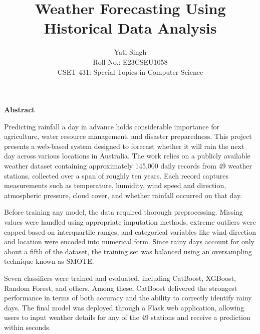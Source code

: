 \documentclass[12pt,a4paper]{article}
\title{\textbf{Weather Forecasting Using Historical Data Analysis}}
\author{Yati Singh \\ Roll No.: E23CSEU1058 \\ CSET 431: Special Topics in Computer Science}
\date{}
\begin{document}
\maketitle

\begin{center}
\textbf{Abstract}
\end{center}

\noindent
Predicting rainfall a day in advance holds considerable importance for agriculture, water resource management, and disaster preparedness. This project presents a web-based system designed to forecast whether it will rain the next day across various locations in Australia. The work relies on a publicly available weather dataset containing approximately 145,000 daily records from 49 weather stations, collected over a span of roughly ten years. Each record captures measurements such as temperature, humidity, wind speed and direction, atmospheric pressure, cloud cover, and whether rainfall occurred on that day.

Before training any model, the data required thorough preprocessing. Missing values were handled using appropriate imputation methods, extreme outliers were capped based on interquartile ranges, and categorical variables like wind direction and location were encoded into numerical form. Since rainy days account for only about a fifth of the dataset, the training set was balanced using an oversampling technique known as SMOTE.

Seven classifiers were trained and evaluated, including CatBoost, XGBoost, Random Forest, and others. Among these, CatBoost delivered the strongest performance in terms of both accuracy and the ability to correctly identify rainy days. The final model was deployed through a Flask web application, allowing users to input weather details for any of the 49 stations and receive a prediction within seconds.
\end{document}
